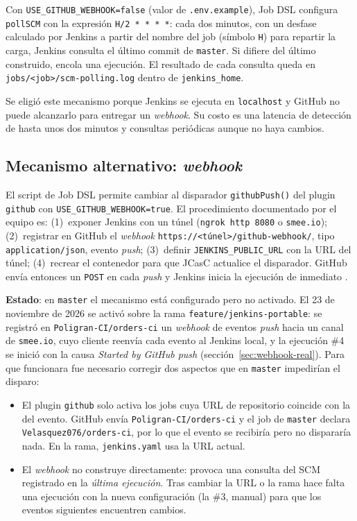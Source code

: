 \documentclass[11pt,a4paper]{article}
\begin{document}
Con \texttt{USE\_GITHUB\_WEBHOOK=false} (valor de \texttt{.env.example}), Job DSL configura
\texttt{pollSCM} con la expresión \texttt{H/2 * * * *}: cada dos minutos, con un desfase calculado por
Jenkins a partir del nombre del job (símbolo \texttt{H}) para repartir la carga, Jenkins consulta el
último commit de \texttt{master}. Si difiere del último construido, encola una ejecución. El resultado
de cada consulta queda en \texttt{jobs/<job>/scm-polling.log} dentro de \texttt{jenkins\_home}.

Se eligió este mecanismo porque Jenkins se ejecuta en \texttt{localhost} y GitHub no puede alcanzarlo
para entregar un \emph{webhook}. Su costo es una latencia de detección de hasta unos dos minutos y
consultas periódicas aunque no haya cambios.

\subsection{Mecanismo alternativo: \emph{webhook}}
\label{sec:webhook}

El script de Job DSL permite cambiar al disparador \texttt{githubPush()} del plugin \texttt{github}
con \texttt{USE\_GITHUB\_WEBHOOK=true}. El procedimiento documentado por el equipo es:
(1)~exponer Jenkins con un túnel (\texttt{ngrok http 8080} o \texttt{smee.io}); (2)~registrar en
GitHub el \emph{webhook} \texttt{https://<túnel>/github-webhook/}, tipo \texttt{application/json},
evento \emph{push}; (3)~definir \texttt{JENKINS\_PUBLIC\_URL} con la URL del túnel; (4)~recrear el
contenedor para que JCasC actualice el disparador. GitHub envía entonces un \texttt{POST} en cada
\emph{push} y Jenkins inicia la ejecución de inmediato \cite{github-webhooks}.

\textbf{Estado}: en \texttt{master} el mecanismo está configurado pero no activado. El 23 de
noviembre de 2026 se activó sobre la rama \texttt{feature/jenkins-portable}: se registró en
\texttt{Poligran-CI/orders-ci} un \emph{webhook} de eventos \emph{push} hacia un canal de
\texttt{smee.io}, cuyo cliente reenvía cada evento al Jenkins local, y la ejecución \#4 se inició con la
causa \emph{Started by GitHub push} (sección~\ref{sec:webhook-real}). Para que funcionara fue necesario
corregir dos aspectos que en \texttt{master} impedirían el disparo:
\begin{itemize}[noitemsep]
  \item El plugin \texttt{github} solo activa los jobs cuya URL de repositorio coincide con la del
        evento. GitHub envía \texttt{Poligran-CI/orders-ci} y el job de \texttt{master} declara
        \texttt{Velasquez076/orders-ci}, por lo que el evento se recibiría pero no dispararía nada. En
        la rama, \texttt{jenkins.yaml} usa la URL actual.
  \item El \emph{webhook} no construye directamente: provoca una consulta del SCM registrado en la
        \emph{última ejecución}. Tras cambiar la URL o la rama hace falta una ejecución con la nueva
        configuración (la \#3, manual) para que los eventos siguientes encuentren cambios.
\end{itemize}
\end{document}
